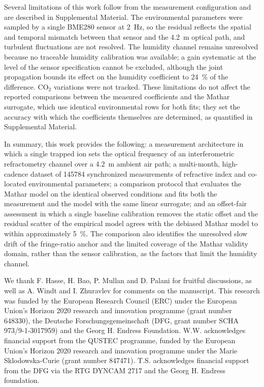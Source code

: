 \documentclass[aps,prapplied,reprint,groupedaddress,twocolumn,superscriptaddress,linenumbers]{revtex4-2}
\begin{document}
Several limitations of this work follow from the measurement configuration and are described in Supplemental Material. The environmental parameters were sampled by a single BME280 sensor at \SI{2}{\hertz}, so the residual reflects the spatial and temporal mismatch between that sensor and the \SI{4.2}{\meter} optical path, and turbulent fluctuations are not resolved. The humidity channel remains unresolved because no traceable humidity calibration was available; a gain systematic at the level of the sensor specification cannot be excluded, although the joint propagation bounds its effect on the humidity coefficient to \SI{24}{\percent} of the difference. CO$_2$ variations were not tracked. These limitations do not affect the reported comparisons between the measured coefficients and the Mathar surrogate, which use identical environmental rows for both fits; they set the accuracy with which the coefficients themselves are determined, as quantified in Supplemental Material.

In summary, this work provides the following: a measurement architecture in which a single trapped ion sets the optical frequency of an interferometric refractometry channel over a \SI{4.2}{\meter} ambient air path; a multi-month, high-cadence dataset of \num{145784} synchronized measurements of refractive index and co-located environmental parameters; a comparison protocol that evaluates the Mathar model on the identical observed conditions and fits both the measurement and the model with the same linear surrogate; and an offset-fair assessment in which a single baseline calibration removes the static offset and the residual scatter of the empirical model agrees with the debiased Mathar model to within approximately \SI{5}{\percent}. The comparison also identifies the unresolved slow drift of the fringe-ratio anchor and the limited coverage of the Mathar validity domain, rather than the sensor calibration, as the factors that limit the humidity channel.

\begin{acknowledgments}
We thank F. Hasse, H. Bao, P. Mullan and D. Palani for fruitful discussions, as well as A. Windt and I. Zhuravlev for comments on the manuscript. This research was funded by the European Research Council (ERC) under the European Union's Horizon 2020 research and innovation programme (grant number 648330), the Deutsche Forschungsgemeinschaft (DFG, grant number SCHA 973/9-1-3017959) and the Georg H. Endress Foundation. W.W. acknowledges financial support from the QUSTEC programme, funded by the European Union's Horizon 2020 research and innovation programme under the Marie Sklodowska-Curie (grant number 847471). T.S. acknowledges financial support from the DFG via the RTG DYNCAM 2717 and the Georg H. Endress foundation.
\end{acknowledgments}
\end{document}
